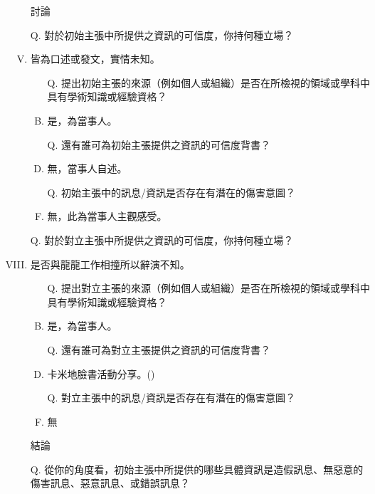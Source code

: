 \documentclass[a4paper, 12pt]{article}
\begin{document}
\begin{enumerate}[I.]
\begin{enumerate}[A.]
\begin{enumerate}[1.]
                    \end{enumerate}
          \end{enumerate}
    \item [] %
    \item [] %
    \item [] 討論
    \item [Q.] 對於{\color{blue}初始主張}中所提供之資訊的可信度，你持何種立場？
    \item 皆為口述或發文，實情未知。
          \begin{enumerate}[A.]
              \item [Q.]提出{\color{blue}初始主張}的來源（例如個人或組織）是否在所檢視的領域或學科中具有學術知識或經驗資格？
              \item 是，為當事人。
              \item [Q.]還有誰可為{\color{blue}初始主張}提供之資訊的可信度背書？
              \item 無，當事人自述。
              \item [Q.]{\color{blue}初始主張}中的訊息/資訊是否存在有潛在的傷害意圖？
              \item 無，此為當事人主觀感受。
          \end{enumerate}
    \item []
    \item [Q.] 對於{\color{red}對立主張}中所提供之資訊的可信度，你持何種立場？
    \item 是否與龍龍工作相撞所以辭演不知。
          \begin{enumerate}[A.]
              \item [Q.] 提出{\color{red}對立主張}的來源（例如個人或組織）是否在所檢視的領域或學科中具有學術知識或經驗資格？
              \item 是，為當事人。
              \item [Q.] 還有誰可為{\color{red}對立主張}提供之資訊的可信度背書？
              \item 卡米地臉書活動分享。(\cite{10158175426336462,froggyroast})
              \item [Q.] {\color{red}對立主張}中的訊息/資訊是否存在有潛在的傷害意圖？
              \item 無
          \end{enumerate}
    \item [] %
    \item [] 結論
    \item [Q.] 從你的角度看，{\color{blue}初始主張}中所提供的哪些具體資訊是造假訊息、無惡意的傷害訊息、惡意訊息、或錯誤訊息？

\end{enumerate}
\end{document}

